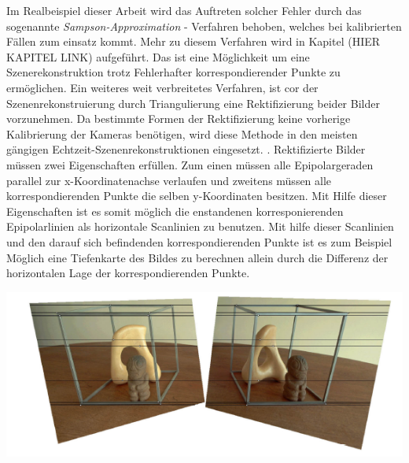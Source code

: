 Im Realbeispiel dieser Arbeit wird das Auftreten solcher Fehler durch das sogenannte \textit{Sampson-Approximation} - Verfahren behoben, welches bei kalibrierten Fällen zum einsatz kommt\cite{HZ}. Mehr zu diesem Verfahren wird in Kapitel (HIER KAPITEL LINK) aufgeführt. Das ist eine Möglichkeit um eine Szenerekonstruktion trotz Fehlerhafter korrespondierender Punkte zu ermöglichen. Ein weiteres weit verbreitetes Verfahren, ist cor der Szenenrekonstruierung durch Triangulierung eine Rektifizierung beider Bilder vorzunehmen\cite{MatlabRec,ZZ,Javier,Fusiello}. Da bestimmte Formen der Rektifizierung keine vorherige Kalibrierung der Kameras benötigen, wird diese Methode in den meisten gängigen Echtzeit-Szenenrekonstruktionen eingesetzt. \cite{Fusiello,Javier,R.H.}.
 Rektifizierte Bilder müssen zwei Eigenschaften erfüllen. Zum einen müssen alle Epipolargeraden parallel zur x-Koordinatenachse verlaufen und zweitens müssen alle korrespondierenden Punkte die selben y-Koordinaten besitzen\cite{ZZ}. Mit Hilfe dieser Eigenschaften ist es somit möglich die enstandenen korresponierenden Epipolarlinien als horizontale Scanlinien zu benutzen\cite{Javier,ZZ}. Mit hilfe dieser Scanlinien und den darauf sich befindenden korrespondierenden Punkte ist es zum Beispiel Möglich eine Tiefenkarte des Bildes zu berechnen allein durch die Differenz der horizontalen Lage der korrespondierenden Punkte\cite{Javier,ZZ}. 
 
 
 \begin{minipage}{\linewidth}
 	\centering
 	\includegraphics[width=1.\linewidth]{images/rectifiziertesBildAusZZ.png}
 \end{minipage}\\ \\

